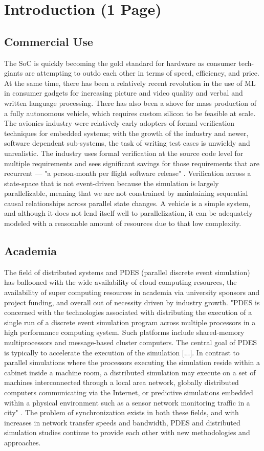 \documentclass[conference]{IEEEtran}
\begin{document}
\section{Introduction (1 Page)}
\subsection{Commercial Use}
The SoC is quickly becoming the gold standard for hardware as consumer tech-giants are attempting to outdo each other in terms of speed, efficiency, and price. At the same time, there has been a relatively recent revolution in the use of ML in consumer gadgets for increasing picture and video quality and verbal and written language processing. There has also been a shove for mass production of a fully autonomous vehicle, which requires custom silicon to be feasible at scale. The avionics industry were relatively early adopters of formal verification techniques for embedded systems; with the growth of the industry and newer, software dependent sub-systems, the task of writing test cases is unwieldy and unrealistic. The industry uses formal verification at the source code level for multiple requirements and sees significant savings for those requirements that are recurrent --- "a person-month per flight software release" \cite{b1}. Verification across a state-space that is not event-driven because the simulation is largely parallelizable, meaning that we are not constrained by maintaining sequential causal relationships across parallel state changes. A vehicle is a simple system, and although it does not lend itself well to parallelization, it can be adequately modeled with a reasonable amount of resources due to that low complexity.

\subsection{Academia}
The field of distributed systems and PDES (parallel discrete event simulation) has ballooned with the wide availability of cloud computing resources, the availability of super computing resources in academia via university sponsors and project funding, and overall out of necessity driven by industry growth. "PDES is concerned with the technologies associated with distributing the execution of a single run of a discrete event simulation program across multiple processors in a high performance computing system. Such platforms include shared-memory multiprocessors and message-based cluster computers. The central goal of PDES is typically to accelerate the execution of the simulation [...]. In contrast to parallel simulations where the processors executing the simulation reside within a cabinet inside a machine room, a distributed simulation may execute on a set of machines interconnected through a local area network, globally distributed computers communicating via the Internet, or predictive simulations embedded within a physical environment such as a sensor network monitoring traffic in a city" \cite{b2}. The problem of synchronization exists in both these fields, and with increases in network transfer speeds and bandwidth, PDES and distributed simulation studies continue to provide each other with new methodologies and approaches.
\end{document}
